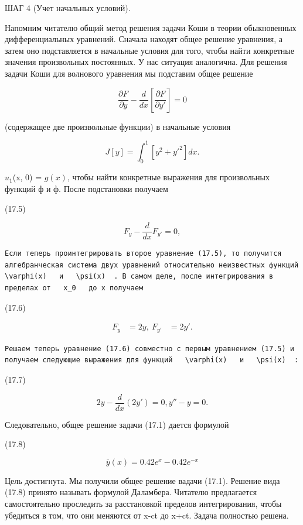 \documentclass[
  ukrainian,
]{article}
\begin{document}
ШАГ 4 (Учет начальных условий).

Напомним читателю общий метод решения задачи Коши в теории обыкновенных
дифференциальных уравнений. Сначала находят общее решение уравнения, а
затем оно подставляется в начальные условия для того, чтобы найти
конкретные значения произвольных постоянных. У нас ситуация аналогична.
Для решения задачи Коши для волнового уравнения мы подставим общее
решение

\[
\frac{\partial F}{\partial y} - \frac{d}{dx} \left[ \frac{\partial F}{\partial y'} \right] = 0
\]

(содержащее две произвольные функции) в начальные условия

\[
J[y] = \int_{0}^{1} [y^{2} + y'^{2}] dx.
\]

\(u_1\)(x, 0) = \(g(x)\), чтобы найти конкретные выражения для
произвольных функций ф и ф. После подстановки получаем

(17.5)

\[
F_y - \frac{d}{dx} F_{y'} = 0,
\]

\begin{verbatim}
Если теперь проинтегрировать второе уравнение (17.5), то получится алгебранческая система двух уравнений относительно неизвестных функций   \varphi(x)   и   \psi(x)  . В самом деле, после интегрирования в пределах от   x_0   до x получаем
\end{verbatim}

(17.6)

\[
\begin{aligned} F_y &= 2y, \ F_{y'} &= 2y'. \end{aligned}
\]

\begin{verbatim}
Решаем теперь уравнение (17.6) совместно с первым уравнением (17.5) и получаем следующие выражения для функций   \varphi(x)   и   \psi(x)  :
\end{verbatim}

(17.7)

\[
2y - \frac{d}{dx}(2y') = 0,
y'' - y = 0.
\]

Следовательно, общее решение задачи (17.1) дается формулой

(17.8)

\[
\overline{y}(x) = 0.42e^x - 0.42e^{-x}
\]

Цель достигнута. Мы получили общее решение вадачи (17.1). Решение вида
(17.8) принято называть формулой Даламбера. Читателю предлагается
самостоятельно проследить за расстановкой пределов интегрирования, чтобы
убедиться в том, что они меняются от x-ct до x+ct. Задача полностью
решена.
\end{document}
